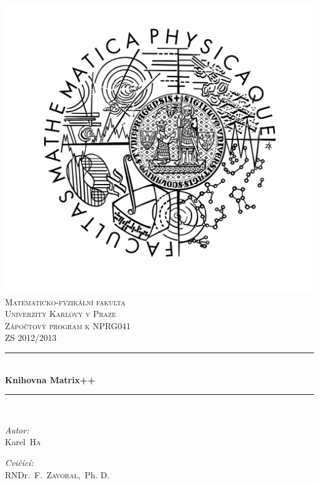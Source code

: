 \documentclass[11pt,a4paper]{article}
\newcommand{\HRule}{\rule{\linewidth}{0.5mm}}
\begin{document}
\begin{titlepage}
\begin{center}
\includegraphics[viewport=180 50 100 100,scale=0.5]{./logo_mff.jpg}\\[1cm]    

\textsc{\LARGE Matematicko-fyzikální fakulta\\[0.1cm]
Univerzity Karlovy v Praze}\\[1.5cm]

\textsc{\Large Zápočtový program k NPRG041\\ ZS 2012/2013}\\[0.5cm]


\HRule \\[0.4cm]
{ \huge \bfseries Knihovna Matrix++}\\[0.4cm]

\HRule \\[1.5cm]

\begin{minipage}{0.4\textwidth}
\begin{flushleft} \large
\emph{Autor:}\\
Karel~\textsc{Ha}
\end{flushleft}
\end{minipage}
\begin{minipage}{0.4\textwidth}
\begin{flushright} \large
\emph{Cvičící:} \\
RNDr.~F.~\textsc{Zavoral},~Ph. D.
\end{flushright}
\end{minipage}


\end{center}
\end{titlepage}
\end{document}

